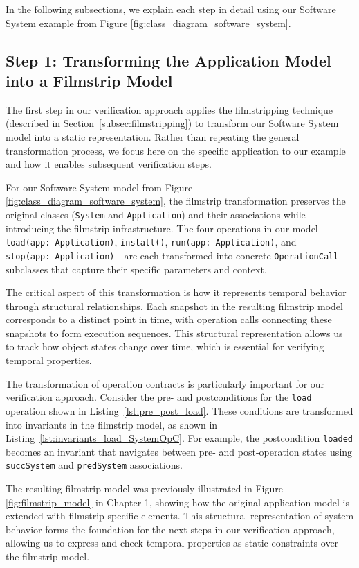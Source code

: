 In the following subsections, we explain each step in detail using our Software 
System example from Figure \ref{fig:class_diagram_software_system}.


\subsection{Step 1: Transforming the Application Model into a Filmstrip Model}

\hspace{1cm} The first step in our verification approach applies the filmstripping 
technique (described in Section~\ref{subsec:filmstripping}) to transform our Software 
System model into a static representation. Rather than repeating the general 
transformation process, we focus here on the specific application to our example 
and how it enables subsequent verification steps.

For our Software System model from Figure \ref{fig:class_diagram_software_system}, 
the filmstrip transformation preserves the original classes (\texttt{System} and 
\texttt{Application}) and their associations while introducing the filmstrip 
infrastructure. The four operations in our model—\texttt{load(app:~Application)}, 
\texttt{install()}, \texttt{run(app:~Application)}, and 
\texttt{stop(app:~Application)}—are each transformed into concrete 
\texttt{OperationCall} subclasses that capture their specific parameters and context.

The critical aspect of this transformation is how it represents temporal behavior 
through structural relationships. Each snapshot in the resulting filmstrip model 
corresponds to a distinct point in time, with operation calls connecting these 
snapshots to form execution sequences. This structural representation allows us to 
track how object states change over time, which is essential for verifying temporal 
properties.

The transformation of operation contracts is particularly important for our 
verification approach. Consider the pre- and postconditions for the \texttt{load} 
operation shown in Listing~\ref{lst:pre_post_load}. These conditions are transformed 
into invariants in the filmstrip model, as shown in 
Listing~\ref{lst:invariants_load_SystemOpC}. For example, the postcondition 
\texttt{loaded} becomes an invariant that navigates between pre- and post-operation 
states using \texttt{succSystem} and \texttt{predSystem} associations.

The resulting filmstrip model was previously illustrated in Figure 
\ref{fig:filmstrip_model} in Chapter 1, showing how the original application model 
is extended with filmstrip-specific elements. This structural representation of 
system behavior forms the foundation for the next steps in our verification approach, 
allowing us to express and check temporal properties as static constraints over the 
filmstrip model.

